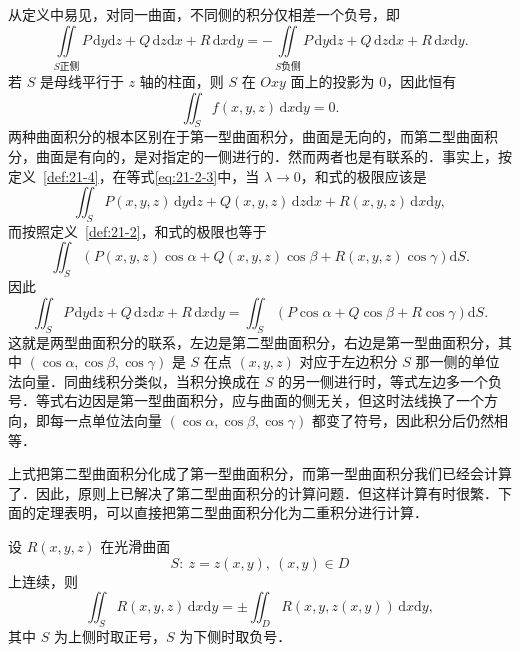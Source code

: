 从定义中易见，对同一曲面，不同侧的积分仅相差一个负号，即
\[
\iint\limits_{S\text{正侧}}P\,\mathrm{d}y\mathrm{d}z+Q\,\mathrm{d}z\mathrm{d}x+R\,\mathrm{d}x\mathrm{d}y=-\iint\limits_{S\text{负侧}}P\,\mathrm{d}y\mathrm{d}z+Q\,\mathrm{d}z\mathrm{d}x+R\,\mathrm{d}x\mathrm{d}y.
\]
若 $S$ 是母线平行于 $z$ 轴的柱面，则 $S$ 在 $Oxy$ 面上的投影为 $0$，因此恒有
\[
\iint_{S}f(x,y,z)\,\mathrm{d}x\mathrm{d}y=0.
\]
两种曲面积分的根本区别在于第一型曲面积分，曲面是无向的，而第二型曲面积分，曲面是有向的，是对指定的一侧进行的．然而两者也是有联系的．事实上，按定义~\ref{def:21-4}，在等式\eqref{eq:21-2-3}中，当 $\lambda\to0$，和式的极限应该是
\[
\iint_{S}P(x,y,z)\,\mathrm{d}y\mathrm{d}z+Q(x,y,z)\,\mathrm{d}z\mathrm{d}x+R(x,y,z)\,\mathrm{d}x\mathrm{d}y,
\]
而按照定义~\ref{def:21-2}，和式的极限也等于
\[
\iint_{S}\left(P(x,y,z)\cos\alpha+Q(x,y,z)\cos\beta+R(x,y,z)\cos\gamma\right)\mathrm{d}S.
\]
因此
\[
\iint_{S}P\,\mathrm{d}y\mathrm{d}z+Q\,\mathrm{d}z\mathrm{d}x+R\,\mathrm{d}x\mathrm{d}y=\iint_{S}\left(P\cos\alpha+Q\cos\beta+R\cos\gamma\right)\mathrm{d}S.
\]
这就是两型曲面积分的联系，左边是第二型曲面积分，右边是第一型曲面积分，其中 $(\cos\alpha,\allowbreak\cos\beta,\allowbreak\cos\gamma)$ 是 $S$ 在点 $(x,y,z)$ 对应于左边积分 $S$ 那一侧的单位法向量．同曲线积分类似，当积分换成在 $S$ 的另一侧进行时，等式左边多一个负号．等式右边因是第一型曲面积分，应与曲面的侧无关，但这时法线换了一个方向，即每一点单位法向量 $(\cos\alpha,\allowbreak\cos\beta,\allowbreak\cos\gamma)$ 都变了符号，因此积分后仍然相等．

上式把第二型曲面积分化成了第一型曲面积分，而第一型曲面积分我们已经会计算了．因此，原则上已解决了第二型曲面积分的计算问题．但这样计算有时很繁．下面的定理表明，可以直接把第二型曲面积分化为二重积分进行计算．

\begin{theorem}\label{thm:21-4}
设 $R(x,y,z)$ 在光滑曲面
\[
S:\ z=z(x,y),\ (x,y)\in D
\]
上连续，则
\[
\iint_{S}R(x,y,z)\,\mathrm{d}x\mathrm{d}y=\pm\iint_{D}R(x,y,z(x,y))\,\mathrm{d}x\mathrm{d}y,
\]
其中 $S$ 为上侧时取正号，$S$ 为下侧时取负号．
\end{theorem}

